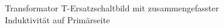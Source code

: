 \begin{figure}[!htbp]
    
    \caption{Transformator T-Ersatzschaltbild mit zusammengefasster Induktivität auf Primärseite}
    \label{fig:transformertequivalent4}
\end{figure}

\clearpage


\setcounter{page}{\thesavepage}

\printbibliography[heading=bibintoc,title={Literaturverzeichnis}]

\clearpage


\printnoidxglossary[style=long,title={Glossar}]

\clearpage


